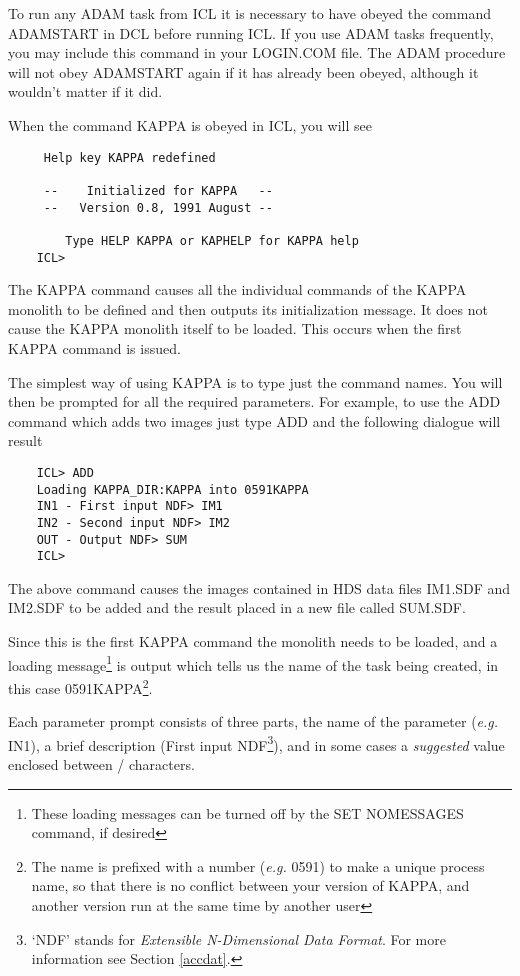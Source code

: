 \documentclass[twoside,11pt]{report}
\begin{document}
To run any ADAM task from ICL it is necessary to have obeyed the command 
ADAMSTART in DCL before running ICL.
If you use ADAM tasks frequently, you may include this command in your 
LOGIN.COM file. The ADAM procedure will not obey ADAMSTART again if it has
already been obeyed, although it wouldn't matter if it did.

When the command KAPPA is obeyed in ICL, you will see         

\begin{verbatim}
     Help key KAPPA redefined
     
     --    Initialized for KAPPA   --
     --   Version 0.8, 1991 August --

        Type HELP KAPPA or KAPHELP for KAPPA help
    ICL>
\end{verbatim}

The KAPPA command causes all the individual commands of the KAPPA monolith
to be defined and then outputs its initialization message. It does not cause
the KAPPA monolith itself to be loaded. This occurs when the first KAPPA
command is issued. 

The simplest way of using KAPPA is to type just the command names. You will
then be prompted for all the required parameters. For example, to use the
ADD command which adds two images just type ADD and the following dialogue
will result

\begin{verbatim}
    ICL> ADD
    Loading KAPPA_DIR:KAPPA into 0591KAPPA
    IN1 - First input NDF> IM1
    IN2 - Second input NDF> IM2
    OUT - Output NDF> SUM
    ICL>
\end{verbatim}

The above command causes the images contained in HDS data files IM1.SDF
and IM2.SDF to be added and the result placed in a new file called SUM.SDF.

Since this is the first KAPPA command the monolith needs to be loaded, and a
loading message\footnote{These loading messages can be turned off by the SET
NOMESSAGES command, if desired} is output which tells us the name of the task
being created, in this case 0591KAPPA\footnote{The name is prefixed with a
number ({\em e.g.} 0591) to make a unique process name, so that there is no conflict
between your version of KAPPA, and another version run at the same time by
another user}. 

Each parameter prompt consists of three parts, the name of the
parameter ({\em e.g.} IN1), a brief description (First input NDF\footnote{ 
`NDF' stands for {\em Extensible N-Dimensional Data Format}. For more
information see Section \ref{accdat}.}), and in some
cases a {\em suggested} value enclosed between / characters.
\end{document}

